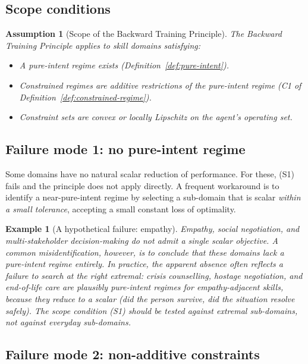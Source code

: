 \documentclass[twocolumn,11pt,a4paper]{article}
\newtheorem{example}[theorem]{Example}
\newtheorem{assumption}[theorem]{Assumption}
\begin{document}
\subsection{Scope conditions}

\begin{assumption}[Scope of the Backward Training Principle]
\label{assum:scope}
The Backward Training Principle applies to skill domains satisfying:
\begin{itemize}[leftmargin=*,itemsep=1pt]
\item[(S1)] A pure-intent regime exists (Definition~\ref{def:pure-intent}).
\item[(S2)] Constrained regimes are additive restrictions of the pure-intent regime (C1 of Definition~\ref{def:constrained-regime}).
\item[(S3)] Constraint sets are convex or locally Lipschitz on the agent's operating set.
\end{itemize}
\end{assumption}

\subsection{Failure mode 1: no pure-intent regime}

Some domains have no natural scalar reduction of performance. For these, (S1) fails and the principle does not apply directly. A frequent workaround is to identify a near-pure-intent regime by selecting a sub-domain that is scalar \emph{within a small tolerance}, accepting a small constant loss of optimality.

\begin{example}[A hypothetical failure: empathy]
Empathy, social negotiation, and multi-stakeholder decision-making do not admit a single scalar objective. A common misidentification, however, is to conclude that these domains lack a pure-intent regime entirely. In practice, the apparent absence often reflects a failure to search at the right extremal: crisis counselling, hostage negotiation, and end-of-life care are plausibly pure-intent regimes for empathy-adjacent skills, because they reduce to a scalar (did the person survive, did the situation resolve safely). The scope condition (S1) should be tested against extremal sub-domains, not against everyday sub-domains.
\end{example}

\subsection{Failure mode 2: non-additive constraints}
\end{document}
